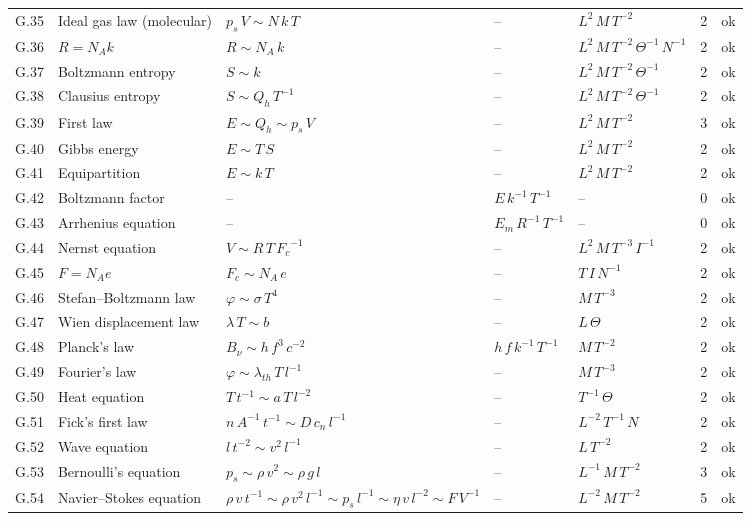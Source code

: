 {\begin{longtable}{@{}l>{\raggedright\arraybackslash}p{3.0cm}>{\raggedright\arraybackslash}p{5.6cm}>{\raggedright\arraybackslash}p{2.0cm}>{\raggedright\arraybackslash}p{2.3cm}rl@{}}
G.35 & Ideal gas law (molecular) & $p_s\,V \sim N\,k\,T$ & -- & $L^{2}\,M\,T^{-2}$ & 2 & ok \\
G.36 & $R = N_A k$ & $R \sim N_A\,k$ & -- & $L^{2}\,M\,T^{-2}\,\Theta^{-1}\,N^{-1}$ & 2 & ok \\
G.37 & Boltzmann entropy & $S \sim k$ & -- & $L^{2}\,M\,T^{-2}\,\Theta^{-1}$ & 2 & ok \\
G.38 & Clausius entropy & $S \sim Q_h\,{T}^{-1}$ & -- & $L^{2}\,M\,T^{-2}\,\Theta^{-1}$ & 2 & ok \\
G.39 & First law & $E \sim Q_h \sim p_s\,V$ & -- & $L^{2}\,M\,T^{-2}$ & 3 & ok \\
G.40 & Gibbs energy & $E \sim T\,S$ & -- & $L^{2}\,M\,T^{-2}$ & 2 & ok \\
G.41 & Equipartition & $E \sim k\,T$ & -- & $L^{2}\,M\,T^{-2}$ & 2 & ok \\
G.42 & Boltzmann factor & -- & $E\,{k}^{-1}\,{T}^{-1}$ & -- & 0 & ok \\
G.43 & Arrhenius equation & -- & $E_m\,{R}^{-1}\,{T}^{-1}$ & -- & 0 & ok \\
G.44 & Nernst equation & $V \sim R\,T\,{F_c}^{-1}$ & -- & $L^{2}\,M\,T^{-3}\,I^{-1}$ & 2 & ok \\
G.45 & $F = N_A e$ & $F_c \sim N_A\,e$ & -- & $T\,I\,N^{-1}$ & 2 & ok \\
G.46 & Stefan--Boltzmann law & $\varphi \sim \sigma\,{T}^{4}$ & -- & $M\,T^{-3}$ & 2 & ok \\
G.47 & Wien displacement law & $\lambda\,T \sim b$ & -- & $L\,\Theta$ & 2 & ok \\
G.48 & Planck's law & $B_\nu \sim h\,{f}^{3}\,{c}^{-2}$ & $h\,f\,{k}^{-1}\,{T}^{-1}$ & $M\,T^{-2}$ & 2 & ok \\
G.49 & Fourier's law & $\varphi \sim \lambda_{th}\,T\,{l}^{-1}$ & -- & $M\,T^{-3}$ & 2 & ok \\
G.50 & Heat equation & $T\,{t}^{-1} \sim a\,T\,{l}^{-2}$ & -- & $T^{-1}\,\Theta$ & 2 & ok \\
G.51 & Fick's first law & $n\,{A}^{-1}\,{t}^{-1} \sim D\,c_n\,{l}^{-1}$ & -- & $L^{-2}\,T^{-1}\,N$ & 2 & ok \\
G.52 & Wave equation & $l\,{t}^{-2} \sim {v}^{2}\,{l}^{-1}$ & -- & $L\,T^{-2}$ & 2 & ok \\
G.53 & Bernoulli's equation & $p_s \sim \rho\,{v}^{2} \sim \rho\,g\,l$ & -- & $L^{-1}\,M\,T^{-2}$ & 3 & ok \\
G.54 & Navier--Stokes equation & $\rho\,v\,{t}^{-1} \sim \rho\,{v}^{2}\,{l}^{-1} \sim p_s\,{l}^{-1} \sim \eta\,v\,{l}^{-2} \sim F\,{V}^{-1}$ & -- & $L^{-2}\,M\,T^{-2}$ & 5 & ok \\

\end{longtable}}
